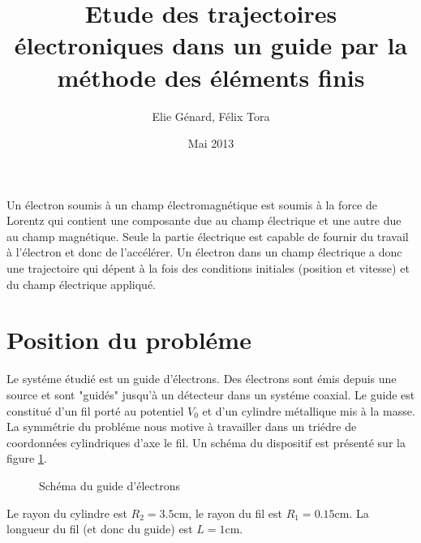 \documentclass[a4paper,12pt]{article}
\title{Etude des trajectoires électroniques dans un guide par la méthode des éléments finis}
\author{Elie Génard, Félix Tora}
\date{Mai 2013}
\begin{document}
\maketitle

Un électron soumis à un champ électromagnétique est soumis à la force de Lorentz qui contient une composante due au champ électrique et une autre due au champ magnétique. Seule la partie électrique est capable de fournir du travail à l'électron et donc de l'accélérer. Un électron dans un champ électrique a donc une trajectoire qui dépent à la fois des conditions initiales (position et vitesse) et du champ électrique appliqué.

\section{Position du probléme}

Le systéme étudié est un guide d'électrons. Des électrons sont émis depuis une source et sont "guidés" jusqu'à un détecteur dans un systéme coaxial. Le guide est constitué d'un fil porté au potentiel $V_0$ et d'un cylindre métallique mis à la masse. La symmétrie du probléme nous motive à travailler dans un triédre de coordonnées cylindriques d'axe le fil. Un schéma du dispositif est présenté sur la figure \ref{fig:schema}.

\begin{figure}[h]
\centering
{}
\caption{Schéma du guide d'électrons}
\label{fig:schema}
\end{figure}
Le rayon du cylindre est $R_2 = 3.5 \mathrm{cm}$, le rayon du fil est $R_1 = 0.15 \mathrm{cm}$. La longueur du fil (et donc du guide) est $L = 1 \mathrm{cm}$.
\end{document}
